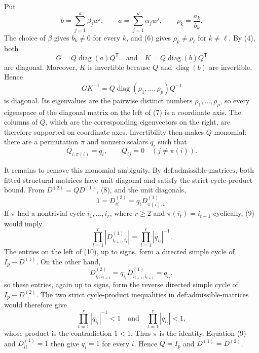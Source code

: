 Put
\[
 b=\sum_{j=1}^d\beta_jw^j,
 \qquad
 a=\sum_{j=1}^d\alpha_jw^j,
 \qquad
 \rho_k=\frac{a_k}{b_k}.
\]
The choice of \(\beta\) gives \(b_k\ne0\) for every \(k\), and (6) gives \(\rho_k\ne\rho_\ell\) for \(k\ne\ell\).  By (4), both
\[
 G=Q\operatorname{diag}(a)Q^{\mathsf T}
 \quad\text{and}\quad
 K=Q\operatorname{diag}(b)Q^{\mathsf T}
\]
are diagonal.  Moreover, \(K\) is invertible because \(Q\) and \(\operatorname{diag}(b)\) are invertible.  Hence
\[
 GK^{-1}
 =Q\operatorname{diag}(\rho_1,\ldots,\rho_p)Q^{-1}
 \tag{7}
\]
is diagonal.  Its eigenvalues are the pairwise distinct numbers \(\rho_1,\ldots,\rho_p\), so every eigenspace of the diagonal matrix on the left of (7) is a coordinate axis.  The columns of \(Q\), which are the corresponding eigenvectors on the right, are therefore supported on coordinate axes.  Invertibility then makes \(Q\) monomial: there are a permutation \(\pi\) and nonzero scalars \(q_i\) such that
\[
 Q_{i,\pi(i)}=q_i,
 \qquad Q_{ij}=0\quad(j\ne\pi(i)).
 \tag{8}
\]

It remains to remove this monomial ambiguity.  By \(\text{def:admissible-matrices}\), both fitted structural matrices have unit diagonal and satisfy the strict cycle-product bound.  From \(D^{(2)}=QD^{(1)}\), (8), and the unit diagonals,
\[
 1=D^{(2)}_{ii}=q_iD^{(1)}_{\pi(i),i}.
 \tag{9}
\]
If \(\pi\) had a nontrivial cycle \(i_1,\ldots,i_r\), where \(r\ge2\) and \(\pi(i_t)=i_{t+1}\) cyclically, (9) would imply
\[
 \prod_{t=1}^r\left|D^{(1)}_{i_{t+1},i_t}\right|
 =\prod_{t=1}^r|q_{i_t}|^{-1}.
 \tag{10}
\]
The entries on the left of (10), up to signs, form a directed simple cycle of \(I_p-D^{(1)}\).  On the other hand,
\[
 D^{(2)}_{i_t,i_{t+1}}
 =q_{i_t}D^{(1)}_{i_{t+1},i_{t+1}}=q_{i_t},
\]
so these entries, again up to signs, form the reverse directed simple cycle of \(I_p-D^{(2)}\).  The two strict cycle-product inequalities in \(\text{def:admissible-matrices}\) would therefore give
\[
 \prod_{t=1}^r|q_{i_t}|^{-1}<1
 \quad\text{and}\quad
 \prod_{t=1}^r|q_{i_t}|<1,
\]
whose product is the contradiction \(1<1\).  Thus \(\pi\) is the identity.  Equation (9) and \(D^{(1)}_{ii}=1\) then give \(q_i=1\) for every \(i\).  Hence \(Q=I_p\) and \(D^{(1)}=D^{(2)}\).